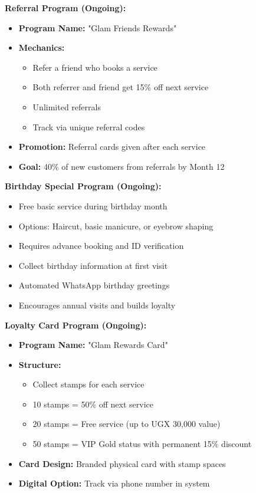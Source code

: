\documentclass[a4paper,12pt]{article}
\begin{document}
\textbf{Referral Program (Ongoing):}
\begin{itemize}[leftmargin=2em]
    \item \textbf{Program Name:} "Glam Friends Rewards"
    \item \textbf{Mechanics:}
    \begin{itemize}
        \item Refer a friend who books a service
        \item Both referrer and friend get 15\% off next service
        \item Unlimited referrals
        \item Track via unique referral codes
    \end{itemize}
    \item \textbf{Promotion:} Referral cards given after each service
    \item \textbf{Goal:} 40\% of new customers from referrals by Month 12
\end{itemize}

\textbf{Birthday Special Program (Ongoing):}
\begin{itemize}[leftmargin=2em]
    \item Free basic service during birthday month
    \item Options: Haircut, basic manicure, or eyebrow shaping
    \item Requires advance booking and ID verification
    \item Collect birthday information at first visit
    \item Automated WhatsApp birthday greetings
    \item Encourages annual visits and builds loyalty
\end{itemize}

\textbf{Loyalty Card Program (Ongoing):}
\begin{itemize}[leftmargin=2em]
    \item \textbf{Program Name:} "Glam Rewards Card"
    \item \textbf{Structure:}
    \begin{itemize}
        \item Collect stamps for each service
        \item 10 stamps = 50\% off next service
        \item 20 stamps = Free service (up to UGX 30,000 value)
        \item 50 stamps = VIP Gold status with permanent 15\% discount
    \end{itemize}
    \item \textbf{Card Design:} Branded physical card with stamp spaces
    \item \textbf{Digital Option:} Track via phone number in system
\end{itemize}
\end{document}
